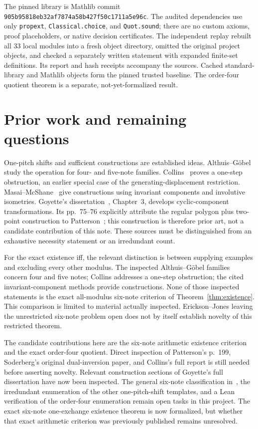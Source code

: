 \documentclass[11pt]{article}
\begin{document}
The pinned library is Mathlib commit \texttt{905b95818eb32af7874a58b427f50c1711a5e96c}. The audited dependencies use only \texttt{propext}, \texttt{Classical.choice}, and \texttt{Quot.sound}; there are no custom axioms, proof placeholders, or native decision certificates. The independent replay rebuilt all 33 local modules into a fresh object directory, omitted the original project objects, and checked a separately written statement with expanded finite-set definitions. Its report and hash receipts accompany the sources. Cached standard-library and Mathlib objects form the pinned trusted baseline. The order-four quotient theorem is a separate, not-yet-formalized result.

\section{Prior work and remaining questions}
One-pitch shifts and sufficient constructions are established ideas. Althuis--G\"obel~\cite{AG} study the operation for four- and five-note families. Collins~\cite{Collins} proves a one-step obstruction, an earlier special case of the generating-displacement restriction. Masai--McShane~\cite{MM} give constructions using invariant components and involutive isometries. Goyette's dissertation~\cite{Goyette}, Chapter~3, develops cyclic-component transformations. Its pp.~75--76 explicitly attribute the regular polygon plus two-point construction to Patterson~\cite[p.~199]{Patterson}; this construction is therefore prior art, not a candidate contribution of this note. These sources must be distinguished from an exhaustive necessity statement or an irredundant count.

For the exact existence iff, the relevant distinction is between supplying examples and excluding every other modulus. The inspected Althuis--G\"obel families concern four and five notes; Collins addresses a one-step obstruction; the cited invariant-component methods provide constructions. None of those inspected statements is the exact all-modulus six-note criterion of Theorem~\ref{thm:existence}. This comparison is limited to material actually inspected. Erickson--Jones leaving the unrestricted six-note problem open does not by itself establish novelty of this restricted theorem.

The candidate contributions here are the six-note arithmetic existence criterion and the exact order-four quotient. Direct inspection of Patterson's p.~199, Soderberg's original dual-inversion paper, and Collins's full report is still needed before asserting novelty. Relevant construction sections of Goyette's full dissertation have now been inspected. The general six-note classification in~\cite{EJ}, the irredundant enumeration of the other one-pitch-shift templates, and a Lean verification of the order-four enumeration remain open tasks in this project. The exact six-note one-exchange existence theorem is now formalized, but whether that exact arithmetic criterion was previously published remains unresolved.
\end{document}
